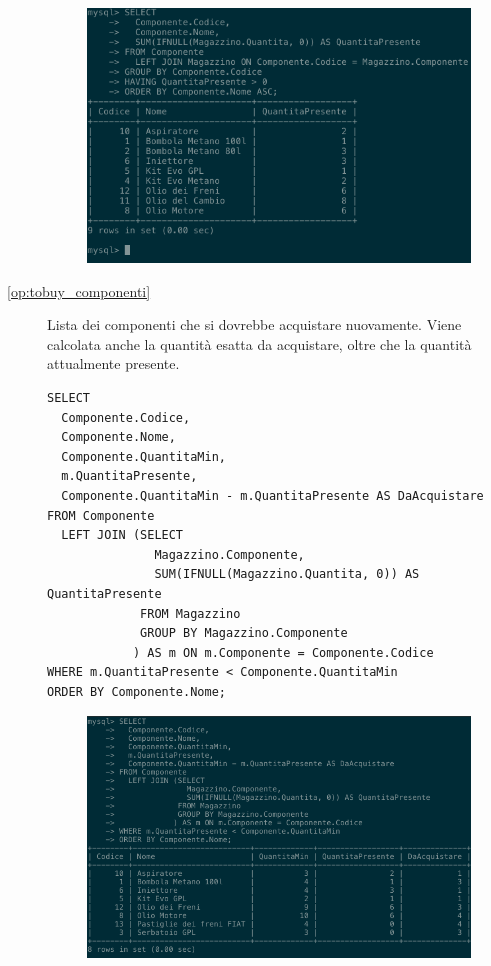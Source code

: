 \begin{description}
              \begin{figure}[H]
                \centering
                \includegraphics[width=12cm]{images/screenshots/stats_componenti.png}
              \end{figure}

            \item[\ref{op:tobuy_componenti}] Lista dei componenti che si dovrebbe acquistare nuovamente. Viene calcolata anche la quantità esatta da acquistare, oltre che la quantità attualmente presente.

              \begin{lstlisting}
SELECT
  Componente.Codice,
  Componente.Nome,
  Componente.QuantitaMin,
  m.QuantitaPresente,
  Componente.QuantitaMin - m.QuantitaPresente AS DaAcquistare
FROM Componente
  LEFT JOIN (SELECT
               Magazzino.Componente,
               SUM(IFNULL(Magazzino.Quantita, 0)) AS QuantitaPresente
             FROM Magazzino
             GROUP BY Magazzino.Componente
            ) AS m ON m.Componente = Componente.Codice
WHERE m.QuantitaPresente < Componente.QuantitaMin
ORDER BY Componente.Nome;
              \end{lstlisting}

              \begin{figure}[H]
                \centering
                \includegraphics[width=12cm]{images/screenshots/tobuy_componenti.png}
              \end{figure}


\end{description}
